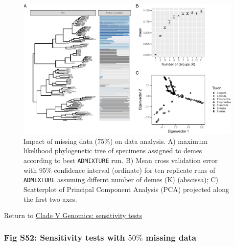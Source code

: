 \documentclass[
  11pt,
]{article}
\begin{document}
\begin{figure}
\includegraphics{Supplementary_Material_files/figure-latex/cladeVgenomicSensitivityAnalysesLargestplots-1} \caption{Impact of missing data ($75\%$) on data analysis. A) maximum likelihood phylogenetic tree of specimens assigned to demes according to best \texttt{ADMIXTURE} run. B) Mean cross validation error with $95\%$ confidence interval (ordinate) for ten replicate runs of \texttt{ADMIXTURE} assuming differnt number of demes (K) (abscissa); C) Scatterplot of Principal Component Analysis (PCA) projected along the first two axes.}\label{fig:cladeVgenomicSensitivityAnalysesLargestplots}
\end{figure}

Return to \protect\hyperlink{sensitivity-tests-4}{Clade V Genomics: sensitivity tests}
\pagebreak

\hypertarget{fig-s52-sensitivity-tests-with-50-missing-data}{%
\subsubsection{\texorpdfstring{Fig S52: Sensitivity tests with \(50\%\) missing data}{Fig S52: Sensitivity tests with 50\textbackslash\% missing data}}\label{fig-s52-sensitivity-tests-with-50-missing-data}}
\end{document}
